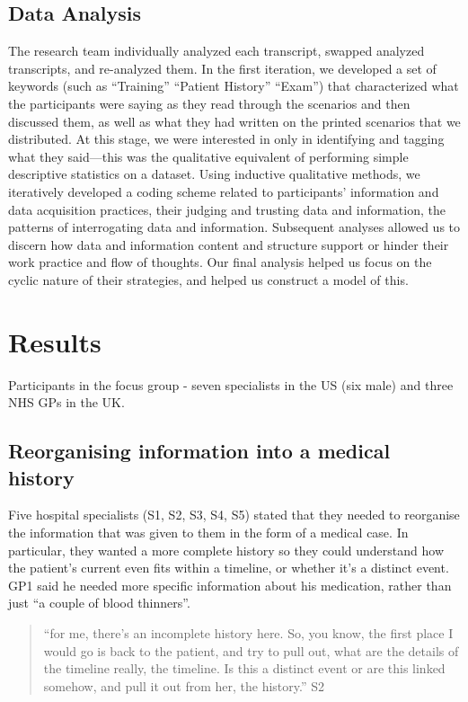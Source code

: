 \documentclass{sigchi}
\begin{document}
\subsection{Data Analysis}
The research team individually analyzed each transcript, swapped analyzed transcripts, and re-analyzed them. \cite{pope2000qualitative}  In the first iteration, we developed a set of keywords (such as “Training” “Patient History” “Exam”) that characterized what the participants were saying as they read through the scenarios and then discussed them, as well as what they had written on the printed scenarios that we distributed. At this stage, we were interested in only in identifying and tagging what they said—this was the qualitative equivalent of performing simple descriptive statistics on a dataset.  Using inductive qualitative methods, \cite{corbin2014basics} we iteratively developed a coding scheme related to participants’ information and data acquisition practices, their judging and trusting data and information, the patterns of interrogating data and information. Subsequent analyses allowed us to discern how data and information content and structure support or hinder their work practice and flow of thoughts.  Our final analysis helped us focus on the cyclic nature of their strategies, and helped us construct a model of this.


\section{Results}

Participants in the focus group - seven specialists in the US (six male) and three NHS GPs in the UK.

    
    
\subsection{Reorganising information into a medical history}
Five hospital specialists (S1, S2, S3, S4, S5) stated that they needed to reorganise the information that was given to them in the form of a medical case. In particular, they wanted a more complete history so they could understand how the patient’s current even fits within a timeline, or whether it’s a distinct event. GP1 said he needed more specific information about his medication, rather than just ``a couple of blood thinners''.

\begin{quote}
    ``for me, there's an incomplete history here. So, you know, the first place I would go is back to the patient, and try to pull out, what are the details of the timeline really, the timeline. Is this a distinct event or are this linked somehow, and pull it out from her, the history.'' S2
\end{quote}
\end{document}
